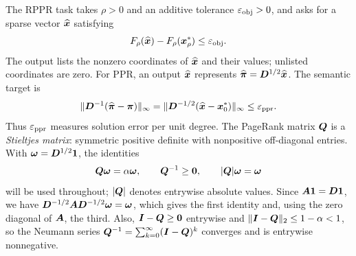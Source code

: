 The RPPR task takes $\rho>0$ and an additive tolerance
$\varepsilon_{\mathrm{obj}}>0$, and asks for a sparse vector $\widehat{\bm{x}}$ satisfying
\begin{equation}
 F_\rho(\widehat{\bm{x}})-F_\rho(\bm{x}_\rho^*)\leq\varepsilon_{\mathrm{obj}}.
 \label{eq:rppr-output-target}
\end{equation}
The output lists the nonzero coordinates of $\widehat{\bm{x}}$ and their values;
unlisted coordinates are zero. For PPR, an output $\widehat{\bm{x}}$ represents
$\widehat{\bm{\pi}}=\bm{D}^{1/2}\widehat{\bm{x}}$. The semantic target is
\begin{equation}
 \lVert\bm{D}^{-1}(\widehat{\bm{\pi}}-\bm{\pi})\rVert_\infty
 =\lVert\bm{D}^{-1/2}(\widehat{\bm{x}}-\bm{x}_0^*)\rVert_\infty
 \leq\varepsilon_{\mathrm{ppr}}.
 \label{eq:semantic-ppr-target}
\end{equation}
Thus $\varepsilon_{\mathrm{ppr}}$ measures solution error per unit degree. The PageRank matrix $\bm{Q}$ is a \emph{Stieltjes matrix}: symmetric positive
definite with nonpositive off-diagonal entries.
With $\bm{\omega}=\bm{D}^{1/2}\mathbf{1}$, the identities
\begin{equation*}
 \bm{Q}\bm{\omega}=\alpha\bm{\omega},\qquad
 \bm{Q}^{-1}\geq\bm{0},
 \qquad |\bm{Q}|\bm{\omega}=\bm{\omega}
\end{equation*}
will be used throughout; $|\bm{Q}|$ denotes entrywise absolute values.
Since $\bm{A}\mathbf{1}=\bm{D}\mathbf{1}$, we have
$\bm{D}^{-1/2}\bm{A}\bm{D}^{-1/2}\bm{\omega}=\bm{\omega}$, which gives the first identity
and, using the zero diagonal of $\bm{A}$, the third. Also,
$\bm{I}-\bm{Q}\geq\bm{0}$ entrywise and
$\lVert\bm{I}-\bm{Q}\rVert_2\leq1-\alpha<1$, so the Neumann series
$\bm{Q}^{-1}=\sum_{k=0}^{\infty}(\bm{I}-\bm{Q})^k$ converges and is entrywise
nonnegative.

